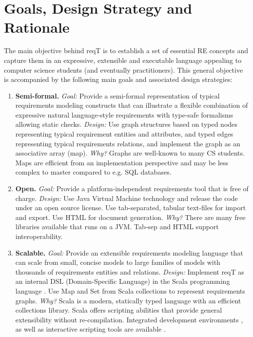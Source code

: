 \documentclass[a4paper]{llncs}
\begin{document}
\section{Goals, Design Strategy and Rationale}\label{section:objectives}
The main objective behind reqT is to establish a set of essential RE concepts and capture them in an expressive, extensible and executable language appealing to computer science students (and eventually practitioners). This general objective is accompanied by the following main goals and associated design strategies:
\begin{enumerate}
\item {\bf Semi-formal.} {\it Goal:} Provide a semi-formal representation of typical requirements modeling constructs that can illustrate a flexible combination of expressive natural language-style requirements with type-safe formalisms allowing static checks. {\it Design:} Use graph structures based on typed nodes representing typical requirement entities and attributes, and typed edges representing typical requirements relations, and implement the graph as an associative array (map). {\it Why?} Graphs are well-known to many CS students. Maps are efficient from an implementation perspective and may be less complex to master compared to e.g. SQL databases.
\item {\bf Open.} {\it Goal:} Provide a platform-independent requirements tool that is free of charge. {\it Design:} Use Java Virtual Machine technology and release the code under an open source license. Use tab-separated, tabular text-files for import and export. Use HTML for document generation. {\it Why?} There are many free libraries available that runs on a JVM. Tab-sep and HTML support interoperability. %
\item {\bf Scalable.} {\it Goal:}  Provide an extensible requirements modeling language that can scale from small, concise models to large families of models with thousands of requirements entities and relations. {\it Design:} Implement reqT as an internal DSL (Domain-Specific Language) in the Scala programming language \cite{Odersky2004}. Use Map and Set from Scala collections to represent requirements graphs. {\it Why?} Scala is a modern, statically typed language with an efficient collections library. Scala offers scripting abilities that provide general extensibility without re-compilation. Integrated development environments \cite{eclipse}, as well as interactive scripting tools are available \cite{kojo}. %
\end{enumerate}
\end{document}
